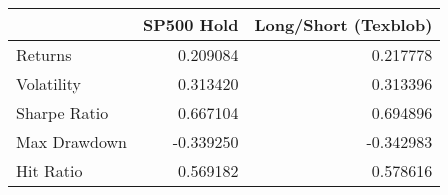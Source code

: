 \begin{tabular}{lrr}
\toprule
{} &  SP500 Hold &  Long/Short (Texblob) \\
\midrule
Returns      &    0.209084 &              0.217778 \\
Volatility   &    0.313420 &              0.313396 \\
Sharpe Ratio &    0.667104 &              0.694896 \\
Max Drawdown &   -0.339250 &             -0.342983 \\
Hit Ratio    &    0.569182 &              0.578616 \\
\bottomrule
\end{tabular}
